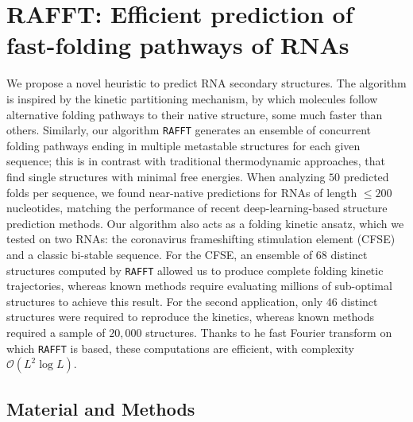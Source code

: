 \chapter{RAFFT: Efficient prediction of fast-folding pathways of RNAs}\label{ch:rafft}

We propose a novel heuristic to predict RNA secondary structures. The algorithm is inspired by the kinetic partitioning mechanism, by which molecules follow alternative folding pathways to their native structure, some much faster than others. Similarly, our algorithm \texttt{RAFFT} generates an ensemble of concurrent folding pathways ending in multiple metastable structures for each given sequence; this is in contrast with traditional thermodynamic approaches, that find single structures with minimal free energies. When analyzing $50$ predicted folds per sequence, we found near-native predictions for RNAs of length $\leq 200$ nucleotides, matching the performance of recent deep-learning-based structure prediction methods. Our algorithm also acts as a folding kinetic ansatz, which we tested on two RNAs: the coronavirus frameshifting stimulation element (CFSE) and a classic bi-stable sequence. For the CFSE, an ensemble of $68$ distinct structures computed by \texttt{RAFFT} allowed us to produce complete folding kinetic trajectories, whereas known methods require evaluating millions of sub-optimal structures to achieve this result. For the second application, only $46$ distinct structures were required to reproduce the kinetics, whereas known methods required a sample of $20,000$ structures. Thanks to he fast Fourier transform on which \texttt{RAFFT} is based, these computations are efficient, with complexity $\mathcal{O}(L^2 \log L)$. 

\section*{Material and Methods}
